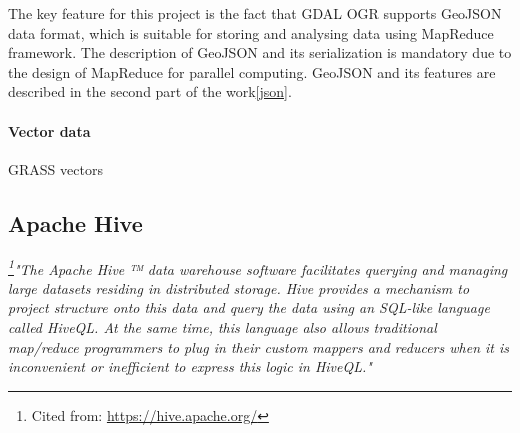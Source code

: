 \documentclass[a4paper,12pt,oneside]{report}
\begin{document}
The key feature for this project is the fact that GDAL OGR supports GeoJSON data format, which is suitable 
for storing and analysing data using MapReduce framework. The description of GeoJSON and its serialization is 
mandatory due to the design of MapReduce 
for parallel computing. GeoJSON and its features are described in the second part of the work\ref{json}.

\paragraph{Vector data}


GRASS vectors 


    \subsection{Apache Hive }
\textit{\footnote{Cited from: \url{https://hive.apache.org/}}"The Apache Hive ™ data warehouse software 
facilitates querying and managing large datasets residing in distributed storage. Hive provides a mechanism 
to project structure onto this data and query the data using an SQL-like language called HiveQL. At the same
time, this language also allows traditional map/reduce programmers to plug in their custom mappers and 
reducers when it is inconvenient or inefficient to express this logic in HiveQL."}


\end{document}
